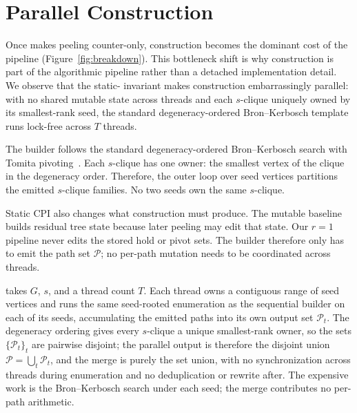 \section{Parallel \cpi{} Construction}\label{sec:parabuild}

Once \spinStar{} makes peeling counter-only, \cpi{} construction becomes the dominant cost of the pipeline (Figure~\ref{fig:breakdown}).
%
This bottleneck shift is why construction is part of the algorithmic pipeline rather than a detached implementation detail.
%
We observe that the static-\cpi{} invariant makes construction embarrassingly parallel: with no shared mutable state across threads and each $s$-clique uniquely owned by its smallest-rank seed, the standard degeneracy-ordered Bron--Kerbosch template runs lock-free across $T$ threads.

The \cpi{} builder follows the standard degeneracy-ordered Bron--Kerbosch search with Tomita pivoting~\cite{NuclearCD,BronKerbosch,eppstein,tomita}.
%
Each $s$-clique has one owner: the smallest vertex of the clique in the degeneracy order.
%
Therefore, the outer loop over seed vertices partitions the emitted $s$-clique families.
%
No two seeds own the same $s$-clique.

Static CPI also changes what construction must produce.
%
The mutable baseline builds residual tree state because later peeling may edit that state.
%
Our $r=1$ pipeline never edits the stored hold or pivot sets.
%
The builder therefore only has to emit the path set $\mathcal{P}$; no per-path mutation needs to be coordinated across threads.

\paraBuild{} takes $G$, $s$, and a thread count $T$.
%
Each thread owns a contiguous range of seed vertices and runs the same seed-rooted enumeration as the sequential builder on each of its seeds, accumulating the emitted paths into its own output set $\mathcal{P}_t$.
%
The degeneracy ordering gives every $s$-clique a unique smallest-rank owner, so the sets $\{\mathcal{P}_t\}_t$ are pairwise disjoint; the parallel output is therefore the disjoint union $\mathcal{P}=\bigcup_t\mathcal{P}_t$, and the merge is purely the set union, with no synchronization across threads during enumeration and no deduplication or rewrite after.
%
The expensive work is the Bron--Kerbosch search under each seed; the merge contributes no per-path arithmetic.

